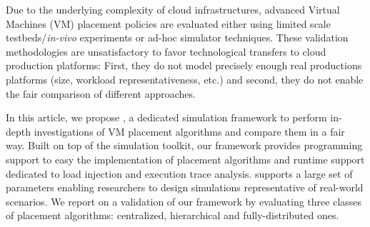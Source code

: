 

 Due to the underlying complexity of cloud infrastructures, advanced
 Virtual Machines (VM) placement policies are evaluated either using limited scale testbeds/\emph{in-vivo}
experiments or ad-hoc simulator techniques. These validation
methodologies are unsatisfactory to favor technological transfers to
cloud production platforms: First, they
do not model precisely enough real productions platforms (size,
workload representativeness, etc.) and second, they do not enable the
fair comparison of different approaches.

In this article, we propose \vmps, a dedicated simulation framework to
perform in-depth investigations of VM placement algorithms and compare
them in a fair way. Built on top of the \sg simulation toolkit, our
framework provides programming support to easy the implementation of
placement algorithms and runtime support dedicated to load injection
and execution trace analysis.
\vmps supports a large set of parameters enabling researchers to design simulations representative of
real-world scenarios.
We report on a validation
of our framework by evaluating three classes of placement algorithms:
centralized, hierarchical and fully-distributed ones.
